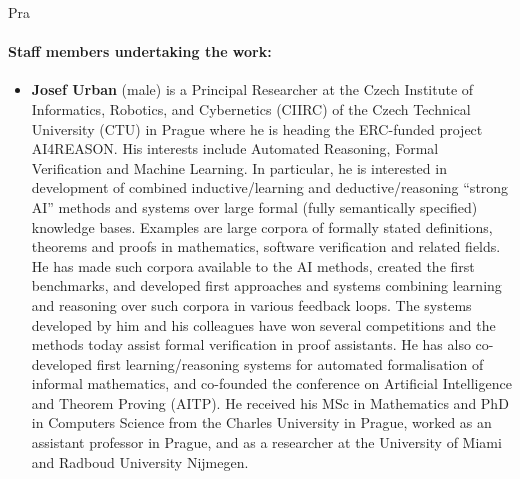 \begin{sitedescription}{Pra}
\paragraph{Staff members undertaking the work:}



\begin{itemize}
\item
\textbf{Josef Urban} (male) is a Principal Researcher at the Czech Institute of Informatics, Robotics, and Cybernetics (CIIRC) of the Czech Technical University (CTU) in Prague where he is heading the ERC-funded project
AI4REASON. His interests include Automated Reasoning, Formal Verification and Machine Learning. In particular, he is interested in development of combined inductive/learning and deductive/reasoning
``strong AI'' methods and systems over large formal (fully semantically specified) knowledge bases. Examples are large corpora of formally stated definitions, theorems and proofs in mathematics, software
verification and related fields.  He has made such corpora available to the AI methods, created the first benchmarks, and developed first approaches and systems combining learning and reasoning over such
corpora in various feedback loops.  The systems developed by him and his colleagues have won several competitions and the methods today assist formal verification in proof assistants. He has also
co-developed first learning/reasoning systems for automated formalisation of informal mathematics, and co-founded the conference on Artificial Intelligence and Theorem Proving (AITP).
He received his MSc in Mathematics and PhD in Computers Science from
the Charles University in Prague, worked as an assistant professor in
Prague, and as a researcher at the University of Miami and Radboud
University Nijmegen.




\end{itemize}
\end{sitedescription}
